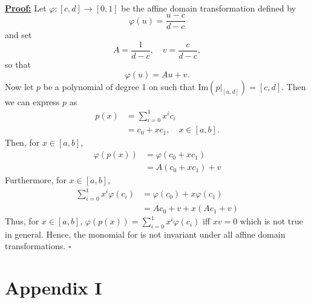 \documentclass[]{article}
\begin{document}
\\
\underline{\textbf{Proof:}} Let $\varphi:[c, d]\rightarrow [0, 1]$ be the affine domain transformation defined by \begin{equation*}
\varphi(u) = \frac{u - c}{d - c}
\end{equation*} 
and set \begin{equation*}
A=\frac{1}{d-c}, \quad v = \frac{c}{d - c},
\end{equation*}
so that \begin{equation*}
\varphi(u) = Au + v.
\end{equation*}
Now let $p$ be a polynomial of degree 1 on such that $\mathrm{Im}(p|_{[a, d]}) = [c, d]$. Then we can express $p$ as \begin{equation*}
\begin{aligned}
p(x) &= \sum_{i=0}^{1}x^ic_i\\
&=c_0 + xc_1, \quad x\in [a, b].
\end{aligned}
\end{equation*}
Then, for $x\in [a, b]$, \begin{equation*}
\begin{aligned}
\varphi(p(x)) &= \varphi(c_0 + xc_1)\\
&=A(c_0 + xc_1) + v
\end{aligned}
\end{equation*}
Furthermore, for $x\in [a, b]$, \begin{equation*}
\begin{aligned}
\sum_{i=0}^{1} x^i\varphi(c_i) &= \varphi(c_0) + x\varphi(c_1)\\
&=Ac_0 + v + x(Ac_1 + v)
\end{aligned}
\end{equation*}
Thus, for $x\in[a, b]$, $\varphi(p(x)) = \sum_{i = 0}^{1}x^i\varphi(c_i)$ iff $xv = 0$ which is not true in general. Hence, the monomial for is not invariant under all affine domain transformations. $\square$

\newpage
\section*{Appendix I}
%
\end{document}
